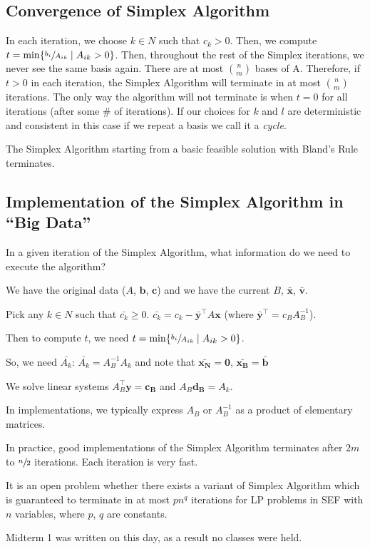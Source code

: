 \subsection{Convergence of Simplex Algorithm}
In each iteration, we choose $k\in N$ such that $c_k>0$. Then, we compute
$t=\min\{\sfrac{b_i}{A_{ik}}\mid A_{ik}>0\}$. Then, throughout the
rest of the Simplex iterations, we never see the same basis again.
There are at most $\binom{n}{m}$ bases of A. Therefore, if $t>0$ in each iteration,
the Simplex Algorithm will terminate in at most $\binom{n}{m}$ iterations. The only
way the algorithm will not terminate is when $t=0$ for all iterations
(after some \# of iterations). If our choices for $k$ and $l$ are deterministic and
consistent in this case if we repeat a basis we call it a \emph{cycle}.

\begin{thmbox}
    \begin{theorem}
        The Simplex Algorithm starting from a basic feasible solution with
        Bland's Rule terminates.
    \end{theorem}
\end{thmbox}

\subsection{Implementation of the Simplex Algorithm in ``Big Data''}
In a given iteration of the Simplex Algorithm, what information do we need to
execute the algorithm?


We have the original data ($A$, $\bm{b}$, $\bm{c}$) and we have the
current $B$, $\bm{\bar{x}}$, $\bm{\bar{v}}$.

Pick any $k\in N$ such that $\bar{c_k}\geqslant  0$. $\bar{c_k}=c_k-\bm{\bar{y}}^\top  A\bm{x}$
(where $\bm{\bar{y}}^\top =c_B A_B^{-1}$).

Then to compute $t$, we need
$t=\min\{\sfrac{b_i}{A_{ik}}\mid A_{ik}>0\}$.

So, we need
$\bar{A_k}$: $\bar{A_k}=A_B^{-1}A_k$ and note that $\bm{\bar{x_N}}=\bm{0}$,
$\bm{\bar{x_B}}=\bm{\bar{b}}$


We solve linear systems $A_B^\top \bm{y}=\bm{c_B}$ and $A_B\bm{d_B}=A_k$.

In implementations, we typically express $A_B$ or $A_B^{-1}$ as a product of elementary
matrices.

In practice, good implementations of the Simplex Algorithm terminates after $2m$ to
$\sfrac{n}{2}$ iterations. Each iteration is very fast.

It is an open problem whether there exists a variant of Simplex Algorithm which is
guaranteed to terminate in at most $pn^q$ iterations for LP problems in SEF with $n$
variables, where $p$, $q$ are constants.


Midterm 1 was written on this day, as a result no classes were
held.
